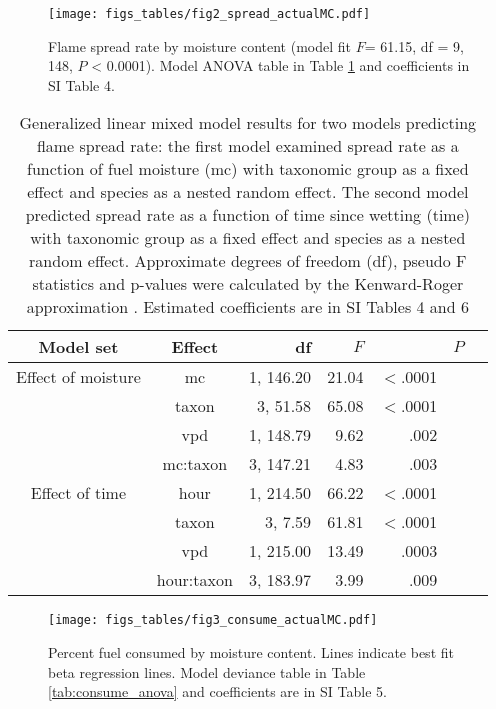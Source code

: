 \documentclass[letterpaper,12pt]{article}
\begin{document}
\begin{figure}[h]
  \centering
\texttt{[image: figs\_tables/fig2\_spread\_actualMC.pdf]}
\caption{Flame spread rate by moisture content (model fit $F$= 61.15, df = 9,
  148, $P$ < 0.0001). Model ANOVA table in Table \ref{tab:spreadrate_anova} and
  coefficients in SI Table 4.}
  \label{fig:spread_moist}
\end{figure}

\begin{table}[h]
  \caption{Generalized linear mixed model results for two models predicting
    flame spread rate: the first model examined spread rate as a function of
    fuel moisture (mc) with taxonomic group as a fixed effect and species as a
    nested random effect. The second model predicted spread rate as a function
    of time since wetting (time) with taxonomic group as a fixed effect and
    species as a nested random effect. Approximate degrees of freedom (df),
    pseudo F statistics and p-values were calculated by the Kenward-Roger
    approximation \citep{Kenward_Roger-1997}. Estimated coefficients are in SI
    Tables 4 and 6}
  \label{tab:spreadrate_anova}
  
\centering
\begin{tabular}{ccrrrrr}
  \toprule
Model set & Effect & df & $F$ & & $P$ \\
  \midrule
  Effect of moisture & mc & 1, 146.20 & 21.04 & $<$.0001 \\ 
 & taxon & 3, 51.58 & 65.08 & $<$.0001 \\ 
 & vpd & 1, 148.79 & 9.62 & .002 \\ 
 & mc:taxon & 3, 147.21 & 4.83 & .003 \\ 
   
  \midrule
  
  Effect of time & hour & 1, 214.50 & 66.22 & $<$.0001 \\ 
 &  taxon & 3, 7.59 & 61.81 & $<$.0001 \\ 
 & vpd & 1, 215.00 & 13.49 & .0003 \\ 
 & hour:taxon & 3, 183.97 & 3.99 & .009 \\ 

   \bottomrule

\end{tabular}
\end{table}

\begin{figure}[h]
  \centering
\texttt{[image: figs\_tables/fig3\_consume\_actualMC.pdf]}
\caption{Percent fuel consumed by moisture content. Lines indicate best fit
  beta regression lines. Model deviance table in Table \ref{tab:consume_anova}
  and coefficients are in SI Table 5.}
  \label{fig:consume_moist}
\end{figure}
\end{document}
